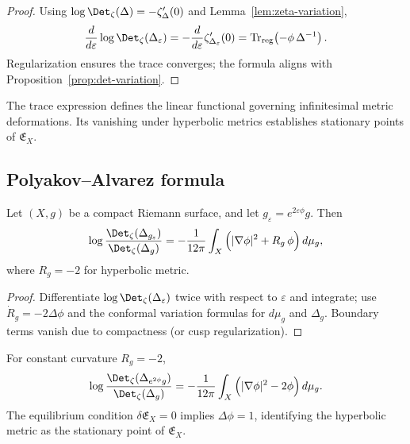 \begin{proof}\relax
Using $\log\Det_\zeta(\Delta)=-\zeta'_\Delta(0)$ and Lemma~\ref{lem:zeta-variation},
\[
\frac{d}{d\varepsilon}\log\Det_\zeta(\Delta_\varepsilon)
= -\frac{d}{d\varepsilon}\zeta'_{\Delta_\varepsilon}(0)
= \mathrm{Tr}_{\mathrm{reg}}\!\left(-\phi\,\Delta^{-1}\right).
\]
Regularization ensures the trace converges; the formula aligns with Proposition~\ref{prop:det-variation}. \relax
\end{proof}

\begin{invariant}
The trace expression defines the linear functional governing infinitesimal metric deformations.  
Its vanishing under hyperbolic metrics establishes stationary points of $\mathfrak{E}_X$. \relax
\end{invariant}

\subsection{Polyakov–Alvarez formula}
\label{subsec:ch4-part7-PA-formula} \relax

\begin{theorem}
\label{thm:PA}
Let $(X,g)$ be a compact Riemann surface, and let $g_\varepsilon = e^{2\varepsilon\phi}g$.  
Then
\[
\log\frac{\Det_\zeta(\Delta_{g_\varepsilon})}{\Det_\zeta(\Delta_g)}
= -\frac{1}{12\pi}\int_X\Big(
|\nabla\phi|^2 + R_g\,\phi
\Big)\,d\mu_g,
\]
where $R_g=-2$ for hyperbolic metric. \relax
\end{theorem}

\begin{proof}\relax
Differentiate $\log\Det_\zeta(\Delta_\varepsilon)$ twice with respect to $\varepsilon$ and integrate;  
use $\dot R_g = -2\Delta\phi$ and the conformal variation formulas for $d\mu_g$ and $\Delta_g$.  
Boundary terms vanish due to compactness (or cusp regularization). \relax
\end{proof}

\begin{corollary}
\label{cor:PA-hyperbolic}
For constant curvature $R_g=-2$,
\[
\log\frac{\Det_\zeta(\Delta_{e^{2\phi}g})}{\Det_\zeta(\Delta_g)}
= -\frac{1}{12\pi}\int_X\Big(|\nabla\phi|^2 -2\phi\Big)\,d\mu_g.
\]
The equilibrium condition $\delta\mathfrak{E}_X=0$ implies $\Delta\phi=1$, identifying the hyperbolic metric as the stationary point of $\mathfrak{E}_X$. \relax
\end{corollary}

